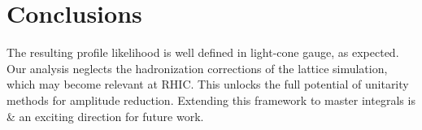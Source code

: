 \section{Conclusions}\label{sec:conclusions}

The resulting profile likelihood is well defined in light-cone gauge, as
expected. Our analysis neglects the hadronization corrections of the
lattice simulation, which may become relevant at RHIC. This unlocks the
full potential of unitarity methods for amplitude reduction. Extending
this framework to master integrals is & an exciting direction for future
work.

